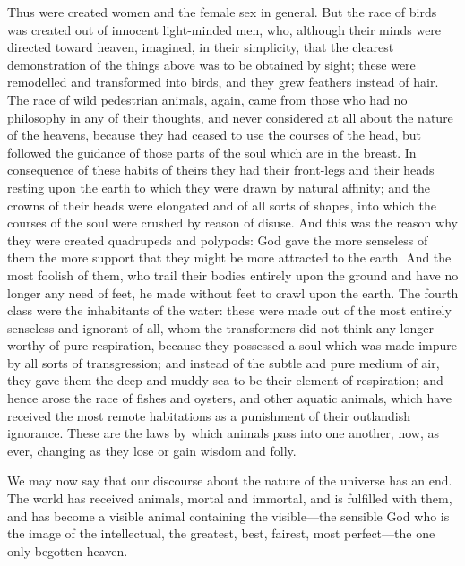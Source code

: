 \documentclass[11pt,letter]{article}
\begin{document}
\par  Thus were created women and the female sex in general. But the race of birds was created out of innocent light-minded men, who, although their minds were directed toward heaven, imagined, in their simplicity, that the clearest demonstration of the things above was to be obtained by sight; these were remodelled and transformed into birds, and they grew feathers instead of hair. The race of wild pedestrian animals, again, came from those who had no philosophy in any of their thoughts, and never considered at all about the nature of the heavens, because they had ceased to use the courses of the head, but followed the guidance of those parts of the soul which are in the breast. In consequence of these habits of theirs they had their front-legs and their heads resting upon the earth to which they were drawn by natural affinity; and the crowns of their heads were elongated and of all sorts of shapes, into which the courses of the soul were crushed by reason of disuse. And this was the reason why they were created quadrupeds and polypods: God gave the more senseless of them the more support that they might be more attracted to the earth. And the most foolish of them, who trail their bodies entirely upon the ground and have no longer any need of feet, he made without feet to crawl upon the earth. The fourth class were the inhabitants of the water: these were made out of the most entirely senseless and ignorant of all, whom the transformers did not think any longer worthy of pure respiration, because they possessed a soul which was made impure by all sorts of transgression; and instead of the subtle and pure medium of air, they gave them the deep and muddy sea to be their element of respiration; and hence arose the race of fishes and oysters, and other aquatic animals, which have received the most remote habitations as a punishment of their outlandish ignorance. These are the laws by which animals pass into one another, now, as ever, changing as they lose or gain wisdom and folly.

\par  We may now say that our discourse about the nature of the universe has an end. The world has received animals, mortal and immortal, and is fulfilled with them, and has become a visible animal containing the visible—the sensible God who is the image of the intellectual, the greatest, best, fairest, most perfect—the one only-begotten heaven.
\end{document}
